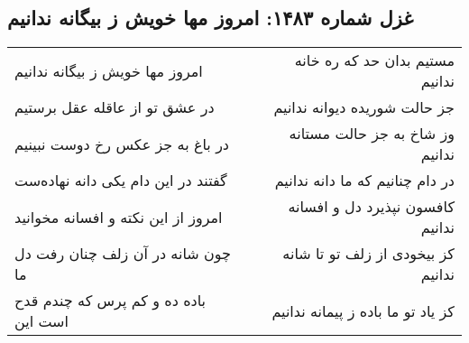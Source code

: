\begin{center}
\section*{غزل شماره ۱۴۸۳: امروز مها خویش ز بیگانه ندانیم}
\label{sec:1483}
\begin{longtable}{l p{0.5cm} r}
امروز مها خویش ز بیگانه ندانیم
&&
مستیم بدان حد که ره خانه ندانیم
\\
در عشق تو از عاقله عقل برستیم
&&
جز حالت شوریده دیوانه ندانیم
\\
در باغ به جز عکس رخ دوست نبینیم
&&
وز شاخ به جز حالت مستانه ندانیم
\\
گفتند در این دام یکی دانه نهاده‌ست
&&
در دام چنانیم که ما دانه ندانیم
\\
امروز از این نکته و افسانه مخوانید
&&
کافسون نپذیرد دل و افسانه ندانیم
\\
چون شانه در آن زلف چنان رفت دل ما
&&
کز بیخودی از زلف تو تا شانه ندانیم
\\
باده ده و کم پرس که چندم قدح است این
&&
کز یاد تو ما باده ز پیمانه ندانیم
\\
\end{longtable}
\end{center}
